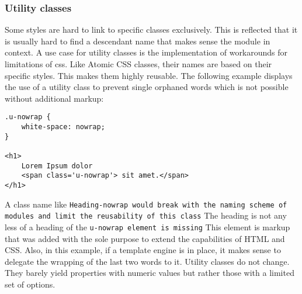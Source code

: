 \subsubsection*{Utility classes}
Some styles are hard to link to specific classes exclusively.
This is reflected that it is usually hard to find a descendant name that makes sense the module in context.
A use case for utility classes is the implementation of workarounds for limitations of \gls{css}.
Like Atomic CSS classes, their names are based on their specific styles.
This makes them highly reusable.
The following example displays the use of a utility class to prevent single orphaned words which is not possible without additional markup:
\begin{lstlisting}
.u-nowrap {
    white-space: nowrap;
}

<h1>
    Lorem Ipsum dolor
    <span class='u-nowrap'> sit amet.</span>
</h1>
\end{lstlisting}
A class name like \verb .Heading-nowrap would break with the naming scheme of modules and limit the reusability of this class.
The heading is not any less of a heading of the \verb .u-nowrap element is missing.
This element is markup that was added with the sole purpose to extend the capabilities of HTML and CSS.
Also, in this example, if a template engine is in place, it makes sense to delegate the wrapping of the last two words to it.
Utility classes do not change.
They barely yield properties with numeric values but rather those with a limited set of options.
